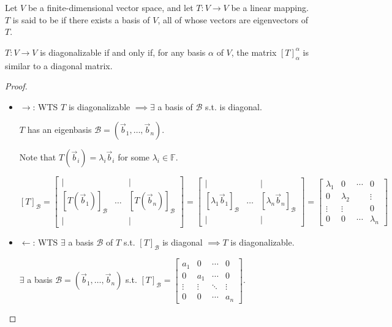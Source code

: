 \documentclass[11pt,fleqn]{book} %
\begin{document}
\setcounter{chapter}{4}
\begin{definition}[Diagonalizable]
    Let $V$ be a finite-dimensional vector space, and let $T: V \to V$ be a linear mapping. $T$ is said to be  if there exists a basis of $V$, all of whose vectors are eigenvectors of $T$.
\end{definition}

\setcounter{dummy}{1}
\begin{proposition}
    $T: V \to V$ is diagonalizable if and only if, for any basis $\alpha$ of $V$, the matrix $[T]_\alpha^\alpha$ is similar to a diagonal matrix.
\end{proposition}
\setcounter{chapter}{3}

\begin{proof}
{~~~}

    \begin{itemize}
        \item $\rightarrow$: WTS $T$ is diagonalizable $\implies \exists$ a basis  of $\mathcal{B}$ s.t.  is diagonal.
         
        $T$ has an eigenbasis $\mathcal{B} = (\vec{b}_1, \dots, \vec{b}_n)$. 
    
        Note that $T(\vec{b}_i) = \lambda_i \vec{b}_i$ for some $\lambda_i \in \mathbb{F}$. 
        
        $[T]_\mathcal{B} = \begin{bmatrix} | & &| \\ [T(\vec{b}_1)]_\mathcal{B} &\dots &[T(\vec{b}_n)]_\mathcal{B} \\ | & &| \end{bmatrix} = \begin{bmatrix} | & &| \\ [\lambda_1\vec{b}_1]_\mathcal{B} &\dots &[\lambda_n\vec{b}_n]_\mathcal{B} \\ | & &| \end{bmatrix} = \begin{bmatrix} \lambda_1 &0 &\cdots &0 \\ 0 &\lambda_2 & &\vdots \\ \vdots &\vdots & &0 \\ 0 &0 &\cdots &\lambda_n  \end{bmatrix}$

        \item $\leftarrow$: WTS $\exists$ a basis $\mathcal{B}$ of $T$ s.t. $[T]_\mathcal{B}$ is diagonal $\implies T$ is diagonalizable.
        
        $\exists$ a basis $\mathcal{B} = (\vec{b}_1, \dots, \vec{b}_n)$ s.t. $[T]_\mathcal{B} = \begin{bmatrix} a_1 &0 &\cdots &0 \\ 0 &a_1 &\cdots &0 \\ \vdots &\vdots &\ddots &\vdots \\ 0 &0 &\cdots &a_n \end{bmatrix}$. 


\end{itemize}
\end{proof}
\end{document}
